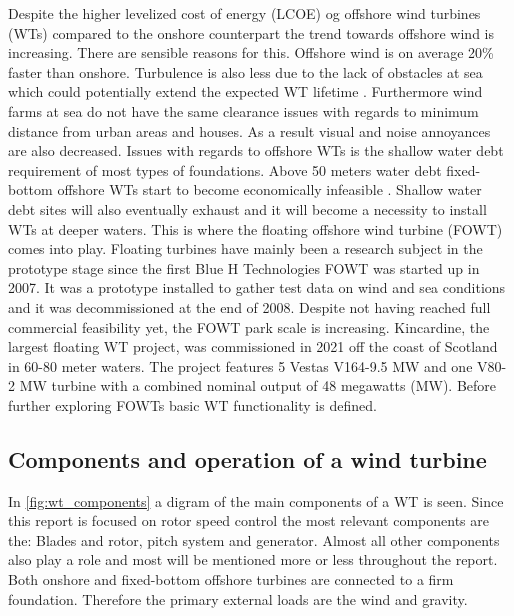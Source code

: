 Despite the higher levelized cost of energy (LCOE) og offshore wind turbines (WTs) compared to the onshore counterpart the trend towards offshore wind is increasing. There are sensible reasons for this. Offshore wind is on average 20\% faster than onshore. Turbulence is also less due to the lack of obstacles at sea which could potentially extend the expected WT lifetime \cite{Christiansen2013}. Furthermore wind farms at sea do not have the same clearance issues with regards to minimum distance from urban areas and houses. As a result visual and noise annoyances are also decreased. Issues with regards to offshore WTs is the shallow water debt requirement of most types of foundations. Above 50 meters water debt fixed-bottom offshore WTs start to become economically infeasible \cite{Lefebvre2012}. Shallow water debt sites will also eventually exhaust and it will become a necessity to install WTs at deeper waters. This is where the floating offshore wind turbine (FOWT) comes into play. Floating turbines have mainly been a research subject in the prototype stage since the first Blue H Technologies FOWT was started up in 2007. It was a prototype installed to gather test data on wind and sea conditions and it was decommissioned at the end of 2008. Despite not having reached full commercial feasibility yet, the FOWT park scale is increasing. Kincardine, the largest floating WT project, was commissioned in 2021 off the coast of Scotland in 60-80 meter waters. The project features 5 Vestas V164-9.5 MW and one V80-2 MW turbine with a combined nominal output of 48 megawatts (MW). Before further exploring FOWTs basic WT functionality is defined.

\subsection{Components and operation of a wind turbine} \label{sec:intro_wtcomponents}
In \cref{fig:wt_components} a digram of the main components of a WT is seen. Since this report is focused on rotor speed control the most relevant components are the: Blades and rotor, pitch system and generator. Almost all other components also play a role and most will be mentioned more or less throughout the report. Both onshore and fixed-bottom offshore turbines are connected to a firm foundation. Therefore the primary external loads are the wind and gravity. 

